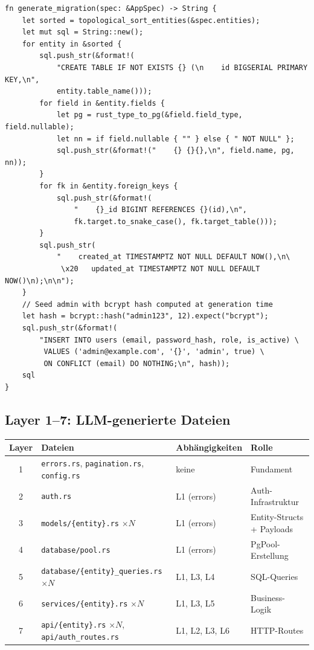 \documentclass[11pt,a4paper]{article}
\begin{document}
\begin{lstlisting}
fn generate_migration(spec: &AppSpec) -> String {
    let sorted = topological_sort_entities(&spec.entities);
    let mut sql = String::new();
    for entity in &sorted {
        sql.push_str(&format!(
            "CREATE TABLE IF NOT EXISTS {} (\n    id BIGSERIAL PRIMARY KEY,\n",
            entity.table_name()));
        for field in &entity.fields {
            let pg = rust_type_to_pg(&field.field_type, field.nullable);
            let nn = if field.nullable { "" } else { " NOT NULL" };
            sql.push_str(&format!("    {} {}{},\n", field.name, pg, nn));
        }
        for fk in &entity.foreign_keys {
            sql.push_str(&format!(
                "    {}_id BIGINT REFERENCES {}(id),\n",
                fk.target.to_snake_case(), fk.target_table()));
        }
        sql.push_str(
            "    created_at TIMESTAMPTZ NOT NULL DEFAULT NOW(),\n\
             \x20   updated_at TIMESTAMPTZ NOT NULL DEFAULT NOW()\n);\n\n");
    }
    // Seed admin with bcrypt hash computed at generation time
    let hash = bcrypt::hash("admin123", 12).expect("bcrypt");
    sql.push_str(&format!(
        "INSERT INTO users (email, password_hash, role, is_active) \
         VALUES ('admin@example.com', '{}', 'admin', true) \
         ON CONFLICT (email) DO NOTHING;\n", hash));
    sql
}
\end{lstlisting}

\subsection{Layer 1--7: LLM-generierte Dateien}

\begin{center}
\scriptsize
\begin{tabular}{clll}
\toprule
\textbf{Layer} & \textbf{Dateien} & \textbf{Abhängigkeiten} & \textbf{Rolle} \\
\midrule
1 & \texttt{errors.rs}, \texttt{pagination.rs}, \texttt{config.rs} & keine & Fundament \\
2 & \texttt{auth.rs} & L1 (errors) & Auth-Infrastruktur \\
3 & \texttt{models/\{entity\}.rs} $\times N$ & L1 (errors) & Entity-Structs + Payloads \\
4 & \texttt{database/pool.rs} & L1 (errors) & PgPool-Erstellung \\
5 & \texttt{database/\{entity\}\_queries.rs} $\times N$ & L1, L3, L4 & SQL-Queries \\
6 & \texttt{services/\{entity\}.rs} $\times N$ & L1, L3, L5 & Business-Logik \\
7 & \texttt{api/\{entity\}.rs} $\times N$, \texttt{api/auth\_routes.rs} & L1, L2, L3, L6 & HTTP-Routes \\
\bottomrule
\end{tabular}
\end{center}
\end{document}
